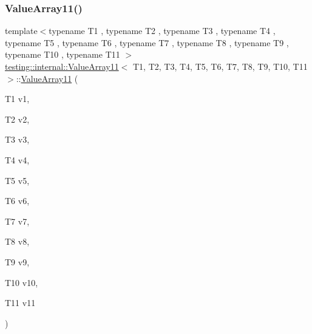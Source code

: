 \subsubsection{\texorpdfstring{ValueArray11()}{ValueArray11()}\hspace{0.1cm}{\footnotesize\ttfamily [1/2]}}
{\footnotesize\ttfamily template$<$typename T1 , typename T2 , typename T3 , typename T4 , typename T5 , typename T6 , typename T7 , typename T8 , typename T9 , typename T10 , typename T11 $>$ \\
\mbox{\hyperlink{classtesting_1_1internal_1_1ValueArray11}{testing\+::internal\+::\+Value\+Array11}}$<$ T1, T2, T3, T4, T5, T6, T7, T8, T9, T10, T11 $>$\+::\mbox{\hyperlink{classtesting_1_1internal_1_1ValueArray11}{Value\+Array11}} (\begin{DoxyParamCaption}\item[{T1}]{v1,  }\item[{T2}]{v2,  }\item[{T3}]{v3,  }\item[{T4}]{v4,  }\item[{T5}]{v5,  }\item[{T6}]{v6,  }\item[{T7}]{v7,  }\item[{T8}]{v8,  }\item[{T9}]{v9,  }\item[{T10}]{v10,  }\item[{T11}]{v11 }\end{DoxyParamCaption})\hspace{0.3cm}{\ttfamily [inline]}}

\mbox{\label{classtesting_1_1internal_1_1ValueArray11_a09b4890b05313d04d98cbb5507d9b34e}} 

